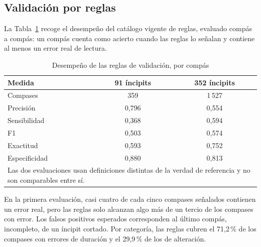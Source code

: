 \documentclass[conference]{IEEEtran}
\begin{document}
\subsection{Validación por reglas}

La Tabla~\ref{tab:validacion} recoge el desempeño del catálogo vigente de
reglas, evaluado compás a compás: un compás cuenta como acierto cuando las
reglas lo señalan y contiene al menos un error real de lectura.

\begin{table}[htbp]
\caption{Desempeño de las reglas de validación, por compás}
\label{tab:validacion}
\centering
\footnotesize
\begin{tabular}{|l|c|c|}
\hline
\textbf{Medida} & \textbf{91 íncipits} & \textbf{352 íncipits} \\
\hline
Compases & 359 & 1\,527 \\
\hline
Precisión & 0,796 & 0,554 \\
\hline
Sensibilidad & 0,368 & 0,594 \\
\hline
F1 & 0,503 & 0,574 \\
\hline
Exactitud & 0,593 & 0,752 \\
\hline
Especificidad & 0,880 & 0,813 \\
\hline
\multicolumn{3}{|p{6.6cm}|}{\scriptsize Las dos evaluaciones usan definiciones distintas de la verdad de referencia y no son comparables entre sí.} \\
\hline
\end{tabular}
\end{table}

En la primera evaluación, casi cuatro de cada cinco compases señalados
contienen un error real, pero las reglas solo alcanzan algo más de un
tercio de los compases con error. Los falsos positivos esperados
corresponden al último compás, incompleto, de un íncipit cortado. Por
categoría, las reglas cubren el 71,2\,\% de los compases con errores de
duración y el 29,9\,\% de los de alteración.
\end{document}
